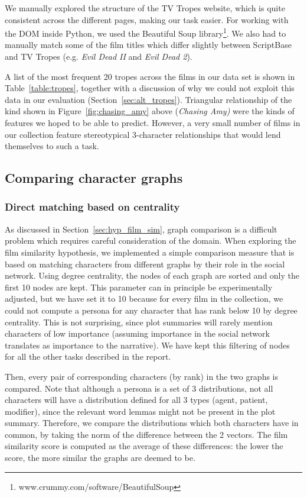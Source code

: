 \documentclass[bsc,frontabs,deptreport,singlespacing,parskip, twoside]{infthesis}
\begin{document}
We manually explored the structure of the TV Tropes website, which is quite consistent across the different pages, making our task easier. For working with the DOM inside Python, we used the Beautiful Soup library\footnote{www.crummy.com/software/BeautifulSoup}. We also had to manually match some of the film titles which differ slightly between ScriptBase and TV Tropes (e.g. \textit{Evil Dead II} and \textit{Evil Dead 2}).

A list of the most frequent 20 tropes across the films in our data set is shown in Table~\ref{table:tropes}, together with a discussion of why we could not exploit this data in our evaluation (Section~\ref{sec:alt_tropes}). Triangular relationship of the kind shown in Figure~\ref{fig:chasing_amy} above (\textit{Chasing Amy)} were the kinds of features we hoped to be able to predict. However, a very small number of films in our collection feature stereotypical 3-character relationships that would lend themselves to such a task.

\subsection{Comparing character graphs}
\label{sec:test_film_sim}

\subsubsection{Direct matching based on centrality}
As discussed in Section~\ref{sec:hyp_film_sim}, graph comparison is a difficult problem which requires careful consideration of the domain. When exploring the film similarity hypothesis, we implemented a simple comparison measure that is based on matching characters from different graphs by their role in the social network. Using degree centrality, the nodes of each graph are sorted and only the first 10 nodes are kept. This parameter can in principle be experimentally adjusted, but we have set it to 10 because for every film in the collection, we could not compute a persona for any character that has rank below 10 by degree centrality. This is not surprising, since plot summaries will rarely mention characters of low importance (assuming importance in the social network translates as importance to the narrative). We have kept this filtering of nodes for all the other tasks described in the report.

Then, every pair of corresponding characters (by rank) in the two graphs is compared. Note that although a persona is a set of 3 distributions, not all characters will have a distribution defined for all 3 types (agent, patient, modifier), since the relevant word lemmas might not be present in the plot summary. Therefore, we compare the distributions which both characters have in common, by taking the norm of the difference between the 2 vectors. The film similarity score is computed as the average of these differences: the lower the score, the more similar the graphs are deemed to be.
\end{document}
